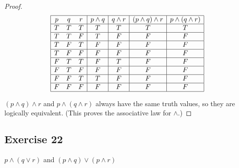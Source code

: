 \documentclass[14pt]{extarticle}
\begin{document}
\begin{proof}
    $$
        \begin{array}{|ccc|c|c|c|c|}
            \hline
            p & q & r & p \wedge q & q \wedge r & (p \wedge q) \wedge r & p \wedge (q \wedge r) \\
            \hline
            T & T & T & T          & T          & T                     & T                     \\
            \hline
            T & T & F & T          & F          & F                     & F                     \\
            \hline
            T & F & T & F          & F          & F                     & F                     \\
            \hline
            T & F & F & F          & F          & F                     & F                     \\
            \hline
            F & T & T & F          & T          & F                     & F                     \\
            \hline
            F & T & F & F          & F          & F                     & F                     \\
            \hline
            F & F & T & T          & F          & F                     & F                     \\
            \hline
            F & F & F & F          & F          & F                     & F                     \\
            \hline
        \end{array}
    $$

    $(p \wedge q) \wedge r$ and $p \wedge (q \wedge r)$ always have the same truth values, so they are logically equivalent. (This proves the associative law for $\wedge$.)
\end{proof}

\subsection{Exercise 22}
$p \wedge (q \vee r)$ and $(p \wedge q) \vee (p \wedge r)$
\end{document}
